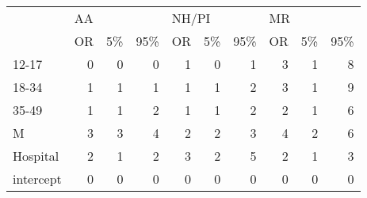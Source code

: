 \centering\begin{tabular}{lrrrrrrrrr}
\toprule
{} & \multicolumn{3}{l}{AA} & \multicolumn{3}{l}{NH/PI} & \multicolumn{3}{l}{MR} \\
{} & OR & 5\% & 95\% &    OR & 5\% & 95\% & OR & 5\% & 95\% \\
\midrule
12-17     &  0 &  0 &   0 &     1 &  0 &   1 &  3 &  1 &   8 \\
18-34     &  1 &  1 &   1 &     1 &  1 &   2 &  3 &  1 &   9 \\
35-49     &  1 &  1 &   2 &     1 &  1 &   2 &  2 &  1 &   6 \\
M         &  3 &  3 &   4 &     2 &  2 &   3 &  4 &  2 &   6 \\
Hospital  &  2 &  1 &   2 &     3 &  2 &   5 &  2 &  1 &   3 \\
intercept &  0 &  0 &   0 &     0 &  0 &   0 &  0 &  0 &   0 \\
\bottomrule
\end{tabular}
